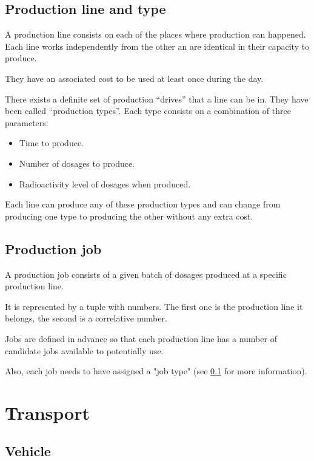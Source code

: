 \subsection{Production line and type}
\label{def:lines}

A production line consists on each of the places where production can happened. Each line works independently from the other an are identical in their capacity to produce.

They have an associated cost to be used at least once during the day.

There exists a definite set of production "`drives"' that a line can be in. They have been called "`production types"'. Each type consists on a combination of three parameters:

\begin{itemize}
	\item Time to produce.
	\item Number of dosages to produce.
	\item Radioactivity level of dosages when produced.
\end{itemize}

Each line can produce any of these production types and can change from producing one type to producing the other without any extra cost.

\subsection{Production job}

A production job consists of a given batch of dosages produced at a specific production line.

It is represented by a tuple with numbers. The first one is the production line it belongs, the second is a correlative number.

Jobs are defined in advance so that each production line has a number of candidate jobs available to potentially use.

Also, each job needs to have assigned a "job type" (see \ref{def:lines} for more information).

\section{Transport}

\subsection{Vehicle}

